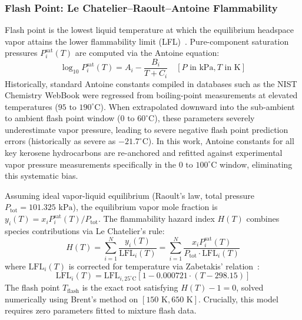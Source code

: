 \documentclass[11pt,a4paper]{article}
\begin{document}
\subsubsection{Flash Point: Le Chatelier--Raoult--Antoine Flammability}
Flash point is the lowest liquid temperature at which the equilibrium headspace vapor attains the lower flammability limit (LFL)~\cite{lechatelier1891estimation}. Pure-component saturation pressures $P_i^{\text{sat}}(T)$ are computed via the Antoine equation:
\begin{equation}
    \log_{10} P_i^{\text{sat}}(T) = A_i - \frac{B_i}{T + C_i} \quad [P \text{ in kPa}, T \text{ in K}]
\end{equation}
Historically, standard Antoine constants compiled in databases such as the NIST Chemistry WebBook were regressed from boiling-point measurements at elevated temperatures ($95\text{ to }190^\circ\text{C}$). When extrapolated downward into the sub-ambient to ambient flash point window ($0\text{ to }60^\circ\text{C}$), these parameters severely underestimate vapor pressure, leading to severe negative flash point prediction errors (historically as severe as $-21.7^\circ\text{C}$). In this work, Antoine constants for all key kerosene hydrocarbons are re-anchored and refitted against experimental vapor pressure measurements specifically in the $0\text{ to }100^\circ\text{C}$ window, eliminating this systematic bias.

Assuming ideal vapor-liquid equilibrium (Raoult's law, total pressure $P_{\text{tot}} = 101.325\text{ kPa}$), the equilibrium vapor mole fraction is $y_i(T) = x_i P_i^{\text{sat}}(T) / P_{\text{tot}}$. The flammability hazard index $H(T)$ combines species contributions via Le Chatelier's rule:
\begin{equation}
    H(T) = \sum_{i=1}^N \frac{y_i(T)}{\text{LFL}_i(T)} = \sum_{i=1}^N \frac{x_i P_i^{\text{sat}}(T)}{P_{\text{tot}} \cdot \text{LFL}_i(T)}
    \label{eq:le_chatelier}
\end{equation}
where $\text{LFL}_i(T)$ is corrected for temperature via Zabetakis' relation~\cite{zabetakis1965flammability}:
\begin{equation}
    \text{LFL}_i(T) = \text{LFL}_{i, 25^\circ\text{C}} \left[ 1 - 0.000721 \cdot (T - 298.15) \right]
\end{equation}
The flash point $T_{\text{flash}}$ is the exact root satisfying $H(T) - 1 = 0$, solved numerically using Brent's method on $[150\text{ K}, 650\text{ K}]$. Crucially, this model requires zero parameters fitted to mixture flash data.
\end{document}
